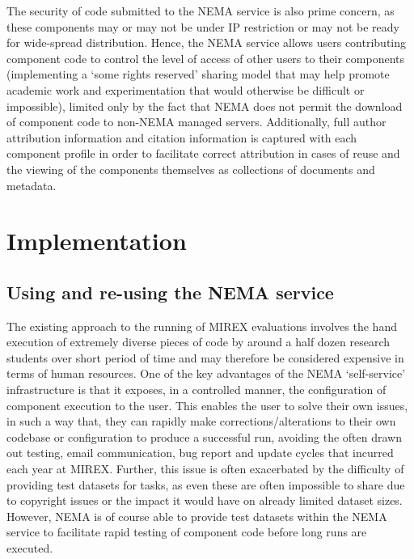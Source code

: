 \documentclass[conference]{IEEEtran}
\begin{document}
The security of code submitted to the NEMA service is also prime concern, as these components may or may not be under IP restriction or may not be ready for wide-spread distribution. Hence, the NEMA service allows users contributing component code to control the level of access of other users to their components (implementing a `some rights reserved' sharing model that may help promote academic work and experimentation that would otherwise be difficult or impossible), limited only by the fact that NEMA does not permit the download of component code to non-NEMA managed servers.
Additionally, full author attribution information and citation information is captured with each component profile in order to facilitate correct attribution in cases of reuse and the viewing of the components themselves as collections of documents and metadata. 

\section{Implementation}
\subsection{Using and re-using the NEMA service}
The existing approach to the running of MIREX evaluations involves the hand execution of extremely diverse pieces of code by around a half dozen research students over short period of time and may therefore be considered expensive in terms of human resources.  One of the key advantages of the NEMA `self-service' infrastructure is that it exposes, in a controlled manner, the configuration of component execution to the user. This enables the user to solve their own issues, in such a way that, they can rapidly make corrections/alterations to their own codebase or configuration to produce a successful run, avoiding the often drawn out testing, email communication, bug report and update cycles that incurred each year at MIREX.
Further, this issue is often exacerbated by the difficulty of providing test datasets for tasks, as even these are often impossible to share due to copyright issues or the impact it would have on already limited dataset sizes. However, NEMA is of course able to provide test datasets within the NEMA service to facilitate rapid testing of component code before long runs are executed. 
\end{document}
